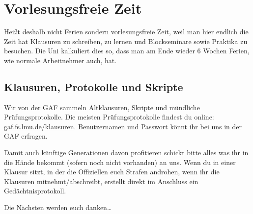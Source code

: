 ﻿
\section{Vorlesungsfreie Zeit}

Heißt deshalb nicht Ferien sondern vorlesungsfreie Zeit, weil man hier endlich die Zeit hat Klausuren zu schreiben, zu lernen und Blockseminare sowie Praktika zu besuchen. Die Uni kalkuliert dies so, dass man am Ende wieder 6 Wochen Ferien, wie normale Arbeitnehmer auch, hat.

\subsection{Klausuren, Protokolle und Skripte}
Wir von der GAF sammeln Altklausuren, Skripte und mündliche Prüfungsprotokolle. Die meisten Prüfungsprotokolle findest du online: \url{gaf.fs.lmu.de/klausuren}. Benutzernamen und Passwort könnt ihr bei uns in der GAF erfragen.

Damit auch künftige Generationen davon profitieren schickt bitte alles
was ihr in die Hände bekommt (sofern noch nicht vorhanden) an uns.
Wenn du in einer Klausur sitzt, in der die Offiziellen euch Strafen
androhen, wenn ihr die Klausuren mitnehmt/abschreibt, erstellt
direkt im Anschluss ein Gedächtnisprotokoll.

Die Nächsten werden euch danken\ldots

